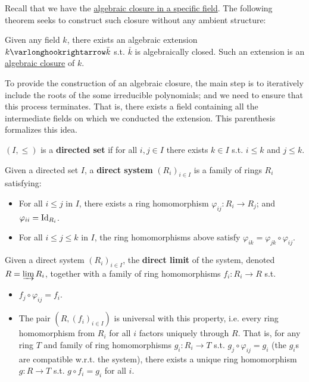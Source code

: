 \documentclass{article}
\begin{document}
Recall that we have the \hyperref[def: algebraic closure with ambient field]{algebraic closure in a specific field}. The following theorem seeks to construct such closure without any ambient structure:

\begin{theorem}\label{thm: algebraic closure exists}
    Given any field $k$, there exists an algebraic extension $k \ext \bar{k}$ s.t. $\bar{k}$ is algebraically closed. Such an extension is an \underline{algebraic closure} of $k$.
\end{theorem}

\begin{parenthesis}\label{pth: direct limit}
    To provide the construction of an algebraic closure, the main step is to iteratively include the roots of the some irreducible polynomials; and we need to ensure that this process terminates. That is, there exists a field containing all the intermediate fields on which we conducted the extension. This parenthesis formalizes this idea.

    \begin{definition}
        $(I, \leq)$ is a \textbf{directed set} if for all $i, j \in I$ there exists $k \in I$ s.t. $i \leq k$ and $j \leq k$.
    \end{definition}

    \begin{definition}
        Given a directed set $I$, a \textbf{direct system} $(R_i)_{i \in I}$ is a family of rings $R_i$ satisfying:
        \begin{itemize}
            \item For all $i \leq j$ in $I$, there exists a ring homomorphism $\varphi_{ij}: R_i \to R_j$; and $\varphi_{ii} = \mathrm{Id}_{R_i}$.
            \item For all $i \leq j \leq k$ in $I$, the ring homomorphisms above satisfy $\varphi_{ik} = \varphi_{jk} \circ \varphi_{ij}$.
        \end{itemize}
    \end{definition}

    \begin{definition}
        Given a direct system $(R_i)_{i \in I}$, the \textbf{direct limit} of the system, denoted $R = \varinjlim R_i$, together with a family of ring homomorphisms $f_i: R_i \to R$ s.t.
        \begin{itemize}
            \item $f_j \circ \varphi_{ij} = f_i$.
            \item The pair $(R, (f_i)_{i \in I})$ is universal with this property, i.e. every ring homomorphism from $R_i$ for all $i$ factors uniquely through $R$. That is, for any ring $T$ and family of ring homomorphisms $g_i: R_i \to T$ s.t. $g_j \circ \varphi_{ij} = g_i$ (the $g_i$s are compatible w.r.t. the system), there exists a unique ring homomorphism $g: R \to T$ s.t. $g \circ f_i = g_i$ for all $i$.
        \end{itemize}
    \end{definition}


\end{parenthesis}
\end{document}
